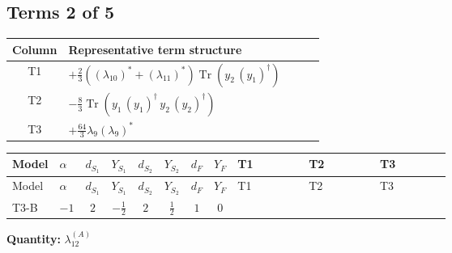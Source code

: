 \documentclass[8pt]{article}
\begin{document}
\begin{landscape}
\subsection*{Terms 2 of 5}
\begin{center}
\begin{tabular}{@{}c >{\raggedright\arraybackslash}p{0.82\linewidth}@{}}
\toprule
Column & Representative term structure \\
\midrule
T1 & \(\displaystyle +\frac{2}{3} (\left({\lambda_{10}}\right)^{*}+\left({\lambda_{11}}\right)^{*}) \operatorname{Tr}\!\left({y_2}\,\left({y_1}\right)^{\dagger}\right)\) \\
\midrule
T2 & \(\displaystyle -\frac{8}{3} \operatorname{Tr}\!\left({y_1}\,\left({y_1}\right)^{\dagger}\,{y_2}\,\left({y_2}\right)^{\dagger}\right)\) \\
\midrule
T3 & \(\displaystyle +\frac{64}{3} {\lambda_{9}} \left({\lambda_{9}}\right)^{*}\) \\
\midrule
\bottomrule
\end{tabular}
\end{center}
\smallskip
\tiny
\begin{longtable}{@{}llcccccc >{\raggedright\arraybackslash}p{0.21\linewidth} >{\raggedright\arraybackslash}p{0.21\linewidth} >{\raggedright\arraybackslash}p{0.21\linewidth}@{}}
\toprule
Model & $\alpha$ & $d_{S_1}$ & $Y_{S_1}$ & $d_{S_2}$ & $Y_{S_2}$ & $d_F$ & $Y_F$ & T1 & T2 & T3 \\
\midrule
\endfirsthead
\toprule
Model & $\alpha$ & $d_{S_1}$ & $Y_{S_1}$ & $d_{S_2}$ & $Y_{S_2}$ & $d_F$ & $Y_F$ & T1 & T2 & T3 \\
\midrule
\endhead
T3-B & $-1$ & $2$ & $-\frac{1}{2}$ & $2$ & $\frac{1}{2}$ & $1$ & $0$ & \scriptsize\adjustbox{max width=\linewidth}{$\begin{gathered} +\frac{2}{3} (\left({\lambda_{10}}\right)^{*}+\left({\lambda_{11}}\right)^{*}) \operatorname{Tr}\!\left({y_2}\,\left({y_1}\right)^{\dagger}\right)\end{gathered}$} & \scriptsize\adjustbox{max width=\linewidth}{$\begin{gathered} -\frac{8}{3} \operatorname{Tr}\!\left({y_1}\,\left({y_1}\right)^{\dagger}\,{y_2}\,\left({y_2}\right)^{\dagger}\right)\end{gathered}$} & \scriptsize\adjustbox{max width=\linewidth}{$\begin{gathered} +\frac{64}{3} {\lambda_{9}} \left({\lambda_{9}}\right)^{*}\end{gathered}$} \\
\midrule
\bottomrule
\end{longtable}
\clearpage
\noindent\textbf{Quantity: }$\lambda_{12}^{(A)}$\par\smallskip

\end{landscape}
\end{document}

